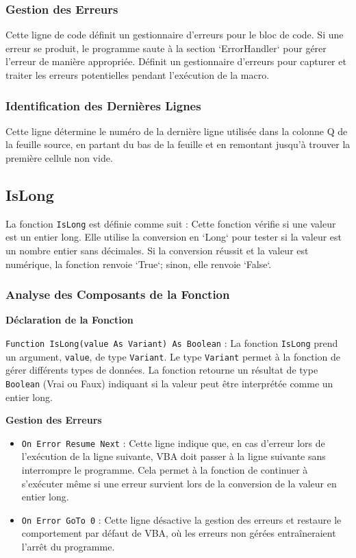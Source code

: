 \documentclass[a4paper, oneside, 12pt, final]{extreport}
\begin{document}
\subsubsection{Gestion des Erreurs}
Cette ligne de code définit un gestionnaire d'erreurs pour le bloc de code. Si une erreur se produit, le programme saute à la section `ErrorHandler` pour gérer l'erreur de manière appropriée.
Définit un gestionnaire d'erreurs pour capturer et traiter les erreurs potentielles pendant l'exécution de la macro.

\subsubsection{Identification des Dernières Lignes}

Cette ligne détermine le numéro de la dernière ligne utilisée dans la colonne Q de la feuille source, en partant du bas de la feuille et en remontant jusqu'à trouver la première cellule non vide.
\subsection{IsLong}

La fonction \texttt{IsLong} est définie comme suit :
Cette fonction vérifie si une valeur est un entier long. Elle utilise la conversion en `Long` pour tester si la valeur est un nombre entier sans décimales. Si la conversion réussit et la valeur est numérique, la fonction renvoie `True`; sinon, elle renvoie `False`.

\subsubsection{Analyse des Composants de la Fonction}

\textbf{Déclaration de la Fonction}

\texttt{Function IsLong(value As Variant) As Boolean} : La fonction \texttt{IsLong} prend un argument, \texttt{value}, de type \texttt{Variant}. Le type \texttt{Variant} permet à la fonction de gérer différents types de données. La fonction retourne un résultat de type \texttt{Boolean} (Vrai ou Faux) indiquant si la valeur peut être interprétée comme un entier long.

\textbf{Gestion des Erreurs}

\begin{itemize}
    \item \texttt{On Error Resume Next} : Cette ligne indique que, en cas d'erreur lors de l'exécution de la ligne suivante, VBA doit passer à la ligne suivante sans interrompre le programme. Cela permet à la fonction de continuer à s'exécuter même si une erreur survient lors de la conversion de la valeur en entier long.
    \item \texttt{On Error GoTo 0} : Cette ligne désactive la gestion des erreurs et restaure le comportement par défaut de VBA, où les erreurs non gérées entraîneraient l'arrêt du programme.
\end{itemize}
\end{document}
